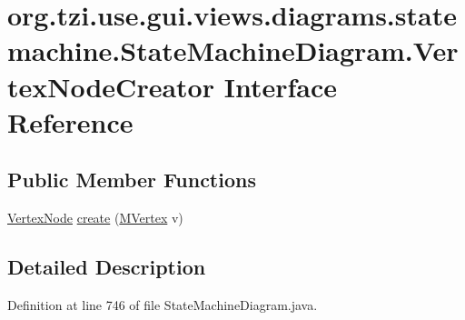 \hypertarget{interfaceorg_1_1tzi_1_1use_1_1gui_1_1views_1_1diagrams_1_1statemachine_1_1_state_machine_diagram_1_1_vertex_node_creator}{\section{org.\-tzi.\-use.\-gui.\-views.\-diagrams.\-statemachine.\-State\-Machine\-Diagram.\-Vertex\-Node\-Creator Interface Reference}
\label{interfaceorg_1_1tzi_1_1use_1_1gui_1_1views_1_1diagrams_1_1statemachine_1_1_state_machine_diagram_1_1_vertex_node_creator}
}
\subsection*{Public Member Functions}
\begin{DoxyCompactItemize}
\item 
\hyperlink{classorg_1_1tzi_1_1use_1_1gui_1_1views_1_1diagrams_1_1statemachine_1_1_vertex_node}{Vertex\-Node} \hyperlink{interfaceorg_1_1tzi_1_1use_1_1gui_1_1views_1_1diagrams_1_1statemachine_1_1_state_machine_diagram_1_1_vertex_node_creator_ade5dd79a7238fc94d8bb7ace4fbe79f7}{create} (\hyperlink{classorg_1_1tzi_1_1use_1_1uml_1_1mm_1_1statemachines_1_1_m_vertex}{M\-Vertex} v)
\end{DoxyCompactItemize}


\subsection{Detailed Description}


Definition at line 746 of file State\-Machine\-Diagram.\-java.



